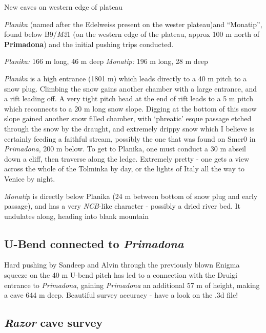 New caves on western edge of plateau

\emph{Planika} (named after the Edelweiss present on the wester
plateau)and ``Monatip'', found below B9/\emph{M2}1 (on the western edge
of the plateau, approx 100 m north of \textbf{Primadona}) and the
initial pushing trips conducted.

\emph{Planika:} 166 m long, 46 m deep \emph{Monatip:} 196 m long, 28 m
deep

\emph{Planika} is a high entrance (1801 m) which leads directly to a 40
m pitch to a snow plug. Climbing the snow gains another chamber with a
large entrance, and a rift leading off. A very tight pitch head at the
end of rift leads to a 5 m pitch which reconnects to a 20 m long snow
slope. Digging at the bottom of this snow slope gained another snow
filled chamber, with `phreatic' esque passage etched through the snow by
the draught, and extremely drippy snow which I believe is certainly
feeding a faithful stream, possibly the one that was found on Smer0 in
\emph{Primadona}, 200 m below. To get to Planika, one must conduct a 30
m abseil down a cliff, then traverse along the ledge. Extremely pretty -
one gets a view across the whole of the Tolminka by day, or the lights
of Italy all the way to Venice by night.

\emph{Monatip} is directly below Planika (24 m between bottom of snow
plug and early passage), and has a very \emph{NCB}-like character -
possibly a dried river bed. It undulates along, heading into blank
mountain

\hypertarget{u-bend-connected-to-primadona}{%
\subsection{\texorpdfstring{U-Bend connected to
\emph{Primadona}}{U-Bend connected to Primadona}}\label{u-bend-connected-to-primadona}}

Hard pushing by Sandeep and Alvin through the previously blown Enigma
squeeze on the 40 m U-bend pitch has led to a connection with the Druigi
entrance to \emph{Primadona}, gaining \emph{Primadona} an additional 57
m of height, making a cave 644 m deep. Beautiful survey accuracy - have
a look on the .3d file!

\hypertarget{razor-cave-survey}{%
\subsection{\texorpdfstring{\emph{Razor} cave
survey}{Razor cave survey}}\label{razor-cave-survey}}

